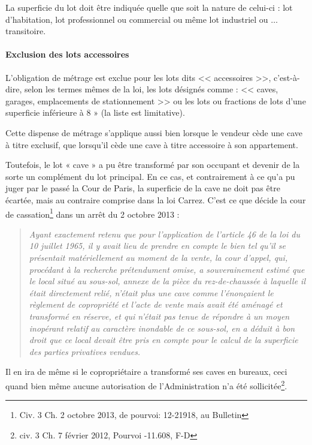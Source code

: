 			La superficie du lot doit être indiquée quelle que soit la nature de celui-ci : lot d'habitation, lot
			professionnel ou commercial ou même lot industriel ou $\dots$ transitoire.
			
			\paragraph{Exclusion des lots accessoires}
			
			L'obligation de métrage est exclue pour les lots dits << accessoires >>, c'est-à-dire, selon les termes mêmes
			de la loi, les lots désignés comme : << caves, garages, emplacements de stationnement >> ou les lots ou
			fractions de lots d'une superficie inférieure à 8 \metreCarre{} » (la liste est limitative).

			Cette dispense de métrage s'applique aussi bien lorsque le vendeur cède une cave à titre exclusif, que
			lorsqu'il cède une cave à titre accessoire à son appartement.
			
			Toutefois, le lot « cave » a pu être transformé par son occupant et devenir de la sorte un complément du
			lot principal. En ce cas, et contrairement à ce qu’a pu juger par le passé la Cour de Paris, la superficie de la
			cave ne doit pas être écartée, mais au contraire comprise dans la loi Carrez. C’est ce que décide la cour de
			cassation\footnote{Civ. 3\ieme{} Ch. 2 octobre 2013, \no de pourvoi: 12-21918, au Bulletin} dans un arrêt du 2 octobre 2013 :
			\begin{quote}
				\emph{Ayant exactement retenu que pour l'application de l'article 46 de la loi du 10 juillet 1965, il y avait
				lieu de prendre en compte le bien tel qu'il se présentait matériellement au moment de la vente, la
				cour d'appel, qui, procédant à la recherche prétendument omise, a souverainement estimé que le
				local situé au sous-sol, annexe de la pièce du rez-de-chaussée à laquelle il était directement relié,
				n'était plus une cave comme l'énonçaient le règlement de copropriété et l'acte de vente mais avait
				été aménagé et transformé en réserve, et qui n'était pas tenue de répondre à un moyen inopérant
				relatif au caractère inondable de ce sous-sol, en a déduit à bon droit que ce local devait être pris
				en compte pour le calcul de la superficie des parties privatives vendues.}
			\end{quote}
			
			Il en ira de même si le copropriétaire a transformé ses caves en bureaux, ceci quand bien même aucune
			autorisation de l’Administration n’a été sollicitée\footnote{civ. 3\ieme{} Ch. 7 février 2012, Pourvoi -11.608, F-D}.
			
